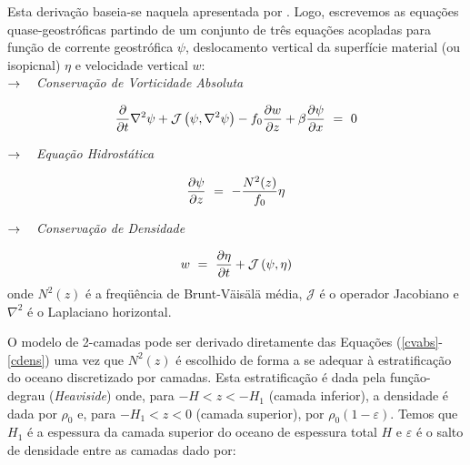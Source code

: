 \hspace{6mm}Esta derivação baseia-se naquela apresentada por \cite{flierl1978}. Logo, escrevemos as 
equações quase-geostróficas partindo de um conjunto de três equações acopladas para função de corrente 
geostrófica $\psi$, deslocamento vertical da superfície material (ou isopicnal) $\eta$ e velocidade 
vertical $w$:\\

\hspace{6mm}$\rightarrow \hspace{3mm}$ \textit{Conservação de Vorticidade Absoluta}

\begin{equation}
\frac{\partial}{\partial t} \nabla^2 \psi + \mathcal{J} \left ( \psi,\nabla^2 \psi \right ) - f_0 \frac{\partial w}{\partial z} + \beta \frac{\partial \psi}{\partial x} \ = \ 0
\label{cvabs}
\vspace{0.5cm}
\end{equation}

\hspace{6mm}$\rightarrow \hspace{3mm}$ \textit{Equação Hidrostática}

\begin{equation}
\frac{\partial \psi}{\partial z} \ = \ - \frac{N^2(z)}{f_0} \eta
\label{hid}
\vspace{0.5cm}
\end{equation}

\hspace{6mm}$\rightarrow \hspace{3mm}$ \textit{Conservação de Densidade}

\begin{equation}
w \ = \ \frac{\partial \eta}{\partial t} + \mathcal{J} \left ( \psi,\eta \right )
\label{cdens}
\vspace{0.5cm}
\end{equation}
onde $N^2(z)$ é a freq\"uência de Brunt-V\"ais\"al\"a média, $\mathcal{J}$ é o operador Jacobiano e 
$\nabla^2$ é o Laplaciano horizontal.

O modelo de 2-camadas pode ser derivado diretamente das Equações (\ref{cvabs}-\ref{cdens}) uma vez 
que $N^2(z)$ é escolhido de forma a se adequar à estratificação do oceano discretizado por camadas. 
Esta estratificação é dada pela função-degrau (\textit{Heaviside}) onde, para $-H < z < -H_1$ (camada 
inferior), a densidade é dada por $\rho_0$ e, para $-H_1 < z < 0$ (camada superior), por 
$\rho_0(1 - \varepsilon)$. Temos que $H_1$ é a espessura da camada superior do oceano de espessura total 
$H$ e $\varepsilon$ é o salto de densidade entre as camadas dado por:

